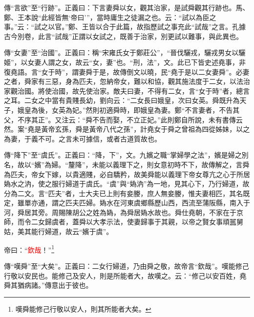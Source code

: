{\noindent\zhuan{}\fzbyks 傳“言欲”至“行跡”。正義曰：下言妻舜以女，觀其治家，是試舜觀其行跡也。馬、鄭、王本說“此經皆無‘帝曰’”，當時庸生之徒漏之也。云：“試以為臣之事。”云：“試之以官。”鄭、王皆以合于此篇，故指歷試之事充此“試哉”之言。孔據古今別卷，此言“試哉”正謂以女試之，既善于治家，別更試以難事，與此異也。 \par}

{\noindent\zhuan{}\fzbyks 傳“女妻”至“治國”。正義曰：稱“宋雍氏女于鄭莊公”，“晉伐驪戎，驪戎男女以驪姬”，以女妻人謂之女，故云“女，妻”也。“刑，法”，文。此已下皆史述堯事，非復堯語。言“女于時”，謂妻舜于是，故傳倒文以曉，民“堯于是以二女妻舜”。必妻之者，舜家有三惡，身為匹夫，忽納帝女，難以和協，觀其施法度于二女，以法治家觀治國。將使治國，故先使治家。敵夫曰妻，不得有二女，言“女于時”者，總言之耳。二女之中當有貴賤長幼，劉向云：“二女長曰娥皇，次曰女英。舜既升為天子，娥皇為後，女英為妃。”然則初適舜時，即娥皇為妻。鄭“不言妻者，不告其父，不序其正”。又注云：“舜不告而娶，不立正妃。”此則鄭自所說，未有書傳云然。案“堯是黃帝玄孫，舜是黃帝八代之孫”，計堯女于舜之曾祖為四從姊妹，以之為妻，于義不可。之言未可據信，或者古道質故也。 \par}

{\noindent\zhuan{}\fzbyks 傳“降下”至“虞氏”。正義曰：“降，下”，文。九嬪之職“掌婦學之法”，嬪是婦之別名，故以“嬪”為婦。“釐降”，未能以義理下之，則女意初時不下，故傳解之，言舜為匹夫，帝女下嫁，以貴適賤，必自驕矜，故美舜能以義理下帝女尊亢之心于所居媯水之汭，使之服行婦道于虞氏。“虞”與“媯汭”為一地，見其心下，乃行婦道，故分為二文。言“匹夫”者，士大夫已上則有妾媵，庶人無妾媵，惟夫妻相匹，其名既定，雖單亦通，謂之匹夫匹婦。媯水在河東虞鄉縣歷山西，西流至蒲阪縣，南入于河，舜居其旁。周賜陳胡公之姓為媯，為舜居媯水故也。舜仕堯朝，不家在于京師，而令二女歸虞者，蓋舜以大孝示法，使妻歸事于其親，以帝之賢女事頑嚚舅姑，美其能行婦道，故云“嬪于虞”。 \par}

帝曰：“\textcolor{red}{欽哉}！”\footnote{嘆舜能修己行敬以安人，則其所能者大矣。}

{\noindent\zhuan{}\fzbyks 傳“嘆舜”至“大矣”。正義曰：二女行婦道，乃由舜之敬，故帝言“欽哉”。嘆能修己行敬以安民也。能修己及安人，則是所能者大，故嘆之。云：“修己以安百姓，堯舜其猶病諸。”傳意出于彼也。 \par}


